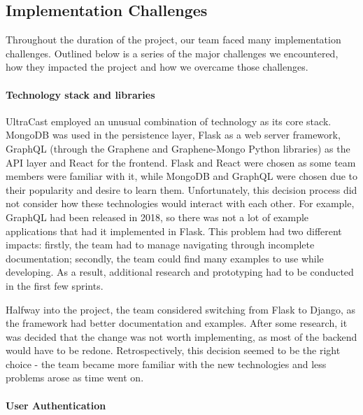 \documentclass[../report.tex]{subfiles}
\begin{document}
\subsection{Implementation Challenges} \label{ssec:backend_challenges}

Throughout the duration of the project, our team faced many implementation challenges.
Outlined below is a series of the major challenges we encountered, how they impacted the project and how we overcame those challenges.

\paragraph{Technology stack and libraries}

UltraCast employed an unusual combination of technology as its core stack.
MongoDB was used in the persistence layer, Flask as a web server framework, GraphQL (through the Graphene and Graphene-Mongo Python libraries) as the API layer and React for the frontend.
Flask and React were chosen as some team members were familiar with it, while MongoDB and GraphQL were chosen due to their popularity and desire to learn them.
Unfortunately, this decision process did not consider how these technologies would interact with each other.
For example, GraphQL had been released in 2018, so there was not a lot of example applications that had it implemented in Flask.
This problem had two different impacts: firstly, the team had to manage navigating through incomplete documentation; secondly, the team could find many examples to use while developing.
As a result, additional research and prototyping had to be conducted in the first few sprints.

Halfway into the project, the team considered switching from Flask to Django, as the framework had better documentation and examples.
After some research, it was decided that the change was not worth implementing, as most of the backend would have to be redone.
Retrospectively, this decision seemed to be the right choice - the team became more familiar with the new technologies and less problems arose as time went on.

\paragraph{User Authentication}
\end{document}
